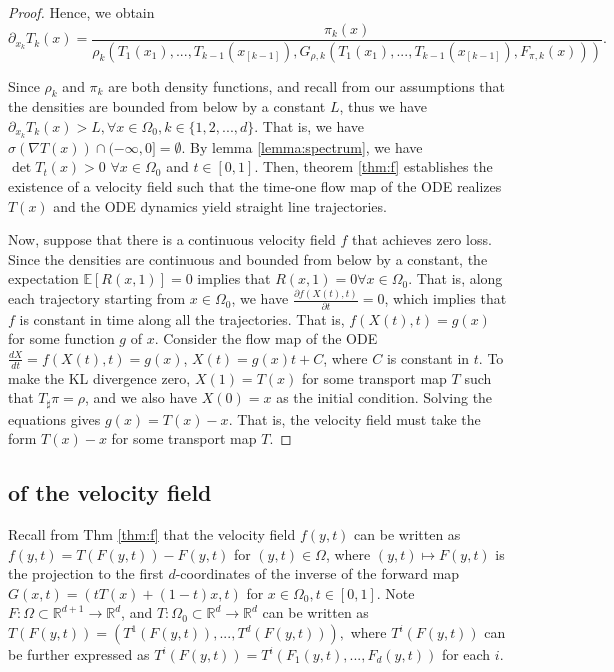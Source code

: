 \begin{proof}
Hence, we obtain
$$\partial_{x_k}T_k(x) = \frac{\pi_k(x)}{\rho_k(T_1(x_1),...,T_{k-1}(x_{[k-1]}), G_{\rho,k}(T_1(x_1),...,T_{k-1}(x_{[k-1]}),F_{\pi,k}(x)))}.$$

Since $\rho_k$ and $\pi_k$ are both density functions, and recall from our assumptions that the densities are bounded from below by a constant $L$, thus we have $\partial_{x_k}T_k(x) > L, \forall x\in\Omega_0, k\in\{1,2,...,d\}$. That is, we have $\sigma(\nabla T(x)) \cap (-\infty, 0] = \emptyset$. By lemma \ref{lemma:spectrum}, we have $\det T_t(x) > 0$ $\forall x\in\Omega_0$ and $t\in[0,1]$. Then, theorem \ref{thm:f} establishes the existence of a velocity field such that the time-one flow map of the ODE realizes $T(x)$ and the ODE dynamics yield straight line trajectories. 

 Now, suppose that there is a continuous velocity field $f$ that achieves zero loss. Since the densities are continuous and bounded from below by a constant, the expectation $\mathbb{E}[R(x,1)] = 0$ implies that $R(x,1) = 0 \forall x\in\Omega_0$.  That is, along each trajectory starting from $x\in\Omega_0$, we have $\frac{\partial f(X(t),t)}{\partial t} = 0$, which implies that $f$ is constant in time along all the trajectories. That is, $f(X(t),t) = g(x)$ for some function $g$ of $x$. Consider the flow map of the ODE $\frac{dX}{dt} = f(X(t),t) = g(x)$, $X(t) = g(x)t + C$, where $C$ is constant in $t$. To make the KL divergence zero, $X(1) = T(x)$ for some transport map $T$ such that $T_\sharp\pi = \rho$, and we also have $X(0) = x$ as the initial condition. Solving the equations gives $g(x) = T(x) - x$. That is, the velocity field must take the form $T(x) - x$ for some transport map $T$.
\end{proof}




\subsection{%
  of the velocity field}
Recall from Thm \ref{thm:f} that the velocity field $f(y,t)$ can be written as $f(y,t) = T(F(y,t)) - F(y,t)$ for $(y,t)\in\Omega$, where $(y,t) \mapsto F(y,t)$ is the projection to the first $d$-coordinates of the inverse of the forward map $G(x,t) = (tT(x) + (1-t)x, t)$ for $x\in\Omega_0, t\in[0,1]$. Note $F:\Omega \subset\mathbb{R}^{d+1} \rightarrow \mathbb{R}^d$, and $T:\Omega_0\subset\mathbb{R}^d \rightarrow\mathbb{R}^d$ can be written as $T(F(y,t)) = (T^1(F(y,t)), ..., T^d(F(y,t))),$ where $T^i(F(y,t))$ can be further expressed as $T^i(F(y,t)) = T^i(F_1(y,t),...,F_d(y,t))$ for each $i$.

